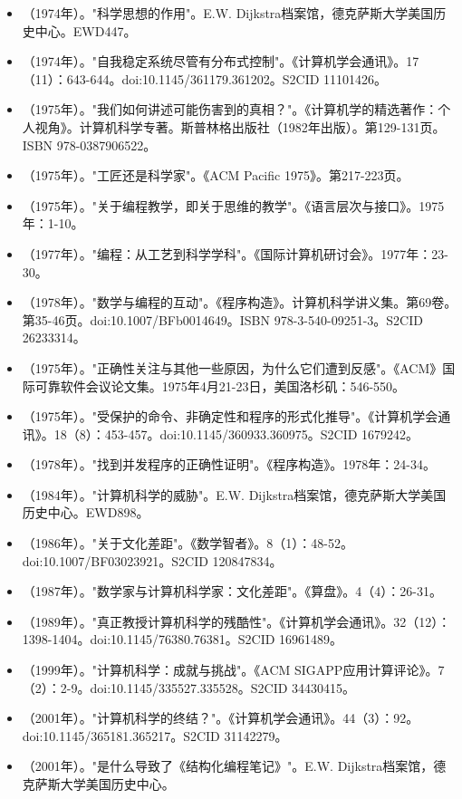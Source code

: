 \begin{itemize}
\item （1974年）。"科学思想的作用"。E.W. Dijkstra档案馆，德克萨斯大学美国历史中心。EWD447。
\item （1974年）。"自我稳定系统尽管有分布式控制"。《计算机学会通讯》。17（11）：643-644。doi:10.1145/361179.361202。S2CID 11101426。
\item （1975年）。"我们如何讲述可能伤害到的真相？"。《计算机学的精选著作：个人视角》。计算机科学专著。斯普林格出版社（1982年出版）。第129-131页。ISBN 978-0387906522。
\item （1975年）。"工匠还是科学家"。《ACM Pacific 1975》。第217-223页。
\item （1975年）。"关于编程教学，即关于思维的教学"。《语言层次与接口》。1975年：1-10。
\item （1977年）。"编程：从工艺到科学学科"。《国际计算机研讨会》。1977年：23-30。
\item （1978年）。"数学与编程的互动"。《程序构造》。计算机科学讲义集。第69卷。第35-46页。doi:10.1007/BFb0014649。ISBN 978-3-540-09251-3。S2CID 26233314。
\item （1975年）。"正确性关注与其他一些原因，为什么它们遭到反感"。《ACM》国际可靠软件会议论文集。1975年4月21-23日，美国洛杉矶：546-550。
\item （1975年）。"受保护的命令、非确定性和程序的形式化推导"。《计算机学会通讯》。18（8）：453-457。doi:10.1145/360933.360975。S2CID 1679242。
\item （1978年）。"找到并发程序的正确性证明"。《程序构造》。1978年：24-34。
\item （1984年）。"计算机科学的威胁"。E.W. Dijkstra档案馆，德克萨斯大学美国历史中心。EWD898。
\item （1986年）。"关于文化差距"。《数学智者》。8（1）：48-52。doi:10.1007/BF03023921。S2CID 120847834。
\item （1987年）。"数学家与计算机科学家：文化差距"。《算盘》。4（4）：26-31。
\item （1989年）。"真正教授计算机科学的残酷性"。《计算机学会通讯》。32（12）：1398-1404。doi:10.1145/76380.76381。S2CID 16961489。
\item （1999年）。"计算机科学：成就与挑战"。《ACM SIGAPP应用计算评论》。7（2）：2-9。doi:10.1145/335527.335528。S2CID 34430415。
\item （2001年）。"计算机科学的终结？"。《计算机学会通讯》。44（3）：92。doi:10.1145/365181.365217。S2CID 31142279。
\item （2001年）。"是什么导致了《结构化编程笔记》"。E.W. Dijkstra档案馆，德克萨斯大学美国历史中心。
\end{itemize}
